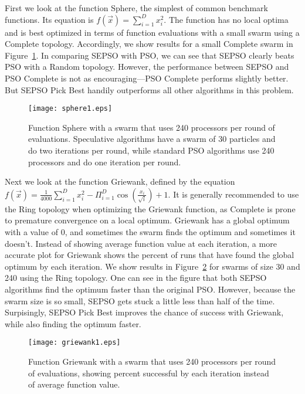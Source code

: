 \documentclass[letterpaper]{sig-alt-release2}
\newcommand{\fig}[1]{Figure~\ref{fig:#1}}
\begin{document}
First we look at the function Sphere, the simplest of common benchmark
functions.  Its equation is $f(\Vec{x}) = \sum_{i=1}^D x_i^2$.  The function
has no local optima and is best optimized in terms of function evaluations with
a small swarm using a Complete topology.  Accordingly, we show results for a
small Complete swarm in \fig{sphere1}.  In comparing SEPSO with PSO, we can see
that SEPSO clearly beats PSO with a Random topology.  However, the performance
between SEPSO and PSO Complete is not as encouraging---PSO Complete performs
slightly better.  But SEPSO Pick Best handily outperforms all other algorithms
in this problem.

\begin{figure}
  \centering
  \texttt{[image: sphere1.eps]}
  \caption{Function Sphere with a swarm that uses 240 processors per round of
  evaluations.  Speculative algorithms have a swarm of 30 particles and do two
  iterations per round, while standard PSO algorithms use 240 processors and do
  one iteration per round.}
  \label{fig:sphere1}
\end{figure}

Next we look at the function Griewank, defined by the equation $f(\Vec{x}) =
\frac{1}{4000} \sum_{i=1}^D x_i^2 - \Pi_{i=1}^D \cos\left(\frac{x_i}{\sqrt{i}}
\right) + 1$.  It is generally recommended to use the Ring topology when
optimizing the Griewank function, as Complete is prone to premature convergence
on a local optimum.  Griewank has a global optimum with a value of 0, and
sometimes the swarm finds the optimum and sometimes it doesn't.  Instead of
showing average function value at each iteration, a more accurate plot for
Griewank shows the percent of runs that have found the global optimum by each
iteration.  We show results in \fig{griewank1} for swarms of size 30 and 240
using the Ring topology.  One can see in the figure that both SEPSO algorithms
find the optimum faster than the original PSO.  However, because the swarm size
is so small, SEPSO gets stuck a little less than half of the time.
Surpisingly, SEPSO Pick Best improves the chance of success with Griewank,
while also finding the optimum faster.

\begin{figure}
  \centering
  \texttt{[image: griewank1.eps]}
  \caption{Function Griewank with a swarm that uses 240 processors per round of
  evaluations, showing percent successful by each iteration instead of average
  function value.}
  \label{fig:griewank1}
\end{figure}
\end{document}
